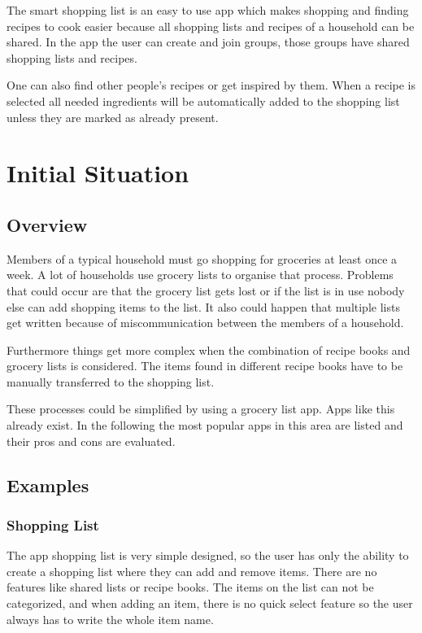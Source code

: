 \documentclass[12pt]{article}
\theoremstyle{definition}
\begin{document}
The smart shopping list is an easy to use app which makes shopping and finding recipes to cook easier because all shopping lists and recipes of a household can be shared. In the app the user can create and join groups, those groups have shared shopping lists and recipes.

One can also find other people's recipes or get inspired by them. When a recipe is selected all needed ingredients will be automatically added to the shopping list unless they are marked as already present. 

\pagebreak

\section{Initial Situation}

\subsection{Overview}

Members of a typical household must go shopping for groceries at least once a week. A lot of households use grocery lists to organise that process. Problems that could occur are that the grocery list gets lost or if the list is in use nobody else can add shopping items to the list. It also could happen that multiple lists get written because of miscommunication between the members of a household.

Furthermore things get more complex when the combination of recipe books and grocery lists is considered. The items found in different recipe books have to be manually transferred to the shopping list. 

These processes could be simplified by using a grocery list app. Apps like this already exist. In the following the most popular apps in this area are listed and their pros and cons are evaluated.

\subsection{Examples}
\subsubsection{Shopping List}
The app shopping list is very simple designed, so the user has only the ability to create a shopping list where they can add and remove items. There are no features like shared lists or recipe books. The items on the list can not be categorized, and when adding an item, there is no quick select feature so the user always has to write the whole item name.
\end{document}
